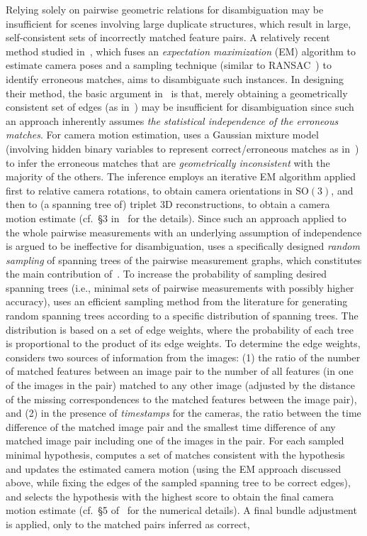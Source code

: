 \documentclass[10pt]{article}
\begin{document}
Relying solely on pairwise geometric relations for disambiguation may be insufficient for scenes involving large duplicate structures, which result in large, self-consistent sets of incorrectly matched feature pairs. A relatively recent method studied in~\cite{RobertsDuplicates}, which fuses an \textit{expectation maximization} (EM) algorithm to estimate camera poses and a sampling technique (similar to RANSAC~\cite{ransac}) to identify erroneous matches, aims to disambiguate such instances. In designing their method, the basic argument in~\cite{RobertsDuplicates} is that, merely obtaining a geometrically consistent set of edges (as in~\cite{ZachDisambig}) may be insufficient for disambiguation since such an approach inherently assumes \textit{the statistical independence of the erroneous matches}. For camera motion estimation, \cite{RobertsDuplicates} uses a Gaussian mixture model (involving hidden binary variables to represent correct/erroneous matches as in~\cite{ZachDisambig}) to infer the erroneous matches that are \textit{geometrically inconsistent} with the majority of the others. The inference employs an iterative EM algorithm applied first to relative camera rotations, to obtain camera orientations in $\mbox{SO}(3)$, and then to (a spanning tree of) triplet $3$D reconstructions, to obtain a camera motion estimate (cf.~\S3 in~\cite{RobertsDuplicates} for the details). Since such an approach applied to the whole pairwise measurements with an underlying assumption of independence is argued to be ineffective for disambiguation, \cite{RobertsDuplicates} uses a specifically designed \textit{random sampling} of spanning trees of the pairwise measurement graphs, which constitutes the main contribution of~\cite{RobertsDuplicates}. To increase the probability of sampling desired spanning trees (i.e., minimal sets of pairwise measurements with possibly higher accuracy), \cite{RobertsDuplicates} uses an efficient sampling method from the literature for generating random spanning trees according to a specific distribution of spanning trees. The distribution is based on a set of edge weights, where the probability of each tree is proportional to the product of its edge weights. To determine the edge weights, \cite{RobertsDuplicates} considers two sources of information from the images: (1) the ratio of the number of matched features between an image pair to the number of all features (in one of the images in the pair) matched to any other image (adjusted by the distance of the missing correspondences to the matched features between the image pair), and (2) in the presence of \textit{timestamps} for the cameras, the ratio between the time difference of the matched image pair and the smallest time difference of any matched image pair including one of the images in the pair. For each sampled minimal hypothesis, \cite{RobertsDuplicates} computes a set of matches consistent with the hypothesis and updates the estimated camera motion (using the EM approach discussed above, while fixing the edges of the sampled spanning tree to be correct edges), and selects the hypothesis with the highest score to obtain the final camera motion estimate (cf.~\S5 of~\cite{RobertsDuplicates} for the numerical details). A final bundle adjustment is applied, only to the matched pairs inferred as correct, 
\end{document}
